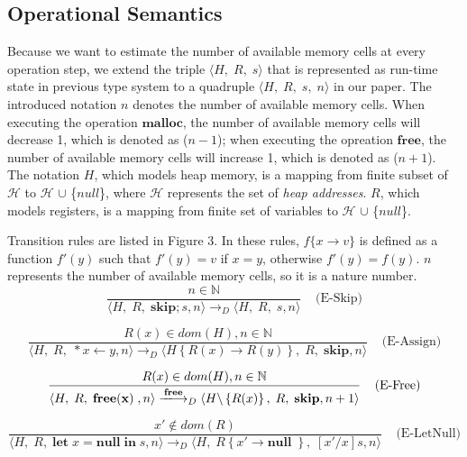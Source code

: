 \documentclass[english]{jssst_ppl} %
\newcommand\LET{\mathbf{let}\;}
\newcommand\FREE{\mathbf{free(x)}\;}
\newcommand\IN{\mathbf{in}\;}
\newcommand\SKIP{\mathbf{skip}}
\newcommand\Rtab{\; \; \; \;}
\newcommand\NULL{\mathbf{null}\;}
\newcommand\Lfc{\left\{}
\newcommand\Rfc{\right\}}
\newcommand\Lb{\left[}
\newcommand\Rb{\right]}
\newcommand\coma{,\;}
\newcommand\Malloc{\mathbf{malloc}}
\newcommand\Free{\mathbf{free}}
\begin{document}
\subsection{Operational Semantics}
Because we want to estimate the number of available memory cells at every operation step, we extend the triple $\langle H\coma R\coma s \rangle$ that is represented as run-time state in previous type system to a quadruple $\langle H\coma R\coma s\coma n \rangle$ in our paper. The introduced notation $n$ denotes the number of available memory cells. When executing the operation $\Malloc$, the number of available memory cells will decrease 1, which is denoted as ($n - 1$); when executing the opreation $\Free$, the number of available memory cells will increase 1, which is denoted as ($n + 1$). The notation $H$, which models heap memory, is a mapping from finite subset of $\mathcal{H}$ to $\mathcal{H}$ $\cup$ \{$null$\}, where $\mathcal{H}$ represents the set of \emph{heap addresses}. $R$, which models registers, is a mapping from finite set of variables to $\mathcal{H}$ $\cup$ \{$null$\}.

Transition rules are listed in Figure 3. In these rules, $f\{x\to v\}$ is defined as a function $f'(y)$ such that $f'(y) = v$ if $x = y$, otherwise $f'(y) = f(y)$. $n$ represents the number of available memory cells, so it is a nature number.
$$
    \frac{n \in \mathbb{N}}
            {\langle H\coma R\coma  \SKIP;s , n \rangle
              \longrightarrow_{D}
                \langle H\coma R\coma   s , n \rangle }
     \Rtab \mbox{(E-Skip)}
$$

$$
     \frac{R(x) \in dom(H), n \in \mathbb{N}}
           {\langle H\coma R\coma  *x \leftarrow y , n \rangle
             \longrightarrow_{D}
             \langle H \Lfc R(x) \rightarrow R(y) \Rfc \coma R \coma   \SKIP , n  \rangle }
     \Rtab \mbox{(E-Assign)}
$$

$$
     \frac{R(x) \in dom(H) , n \in \mathbb{N}}
          {\langle H\coma R\coma  \FREE , n \rangle
            \xlongrightarrow{\Free}_{D}
            \langle H\backslash \Lfc R(x) \Rfc \coma R \coma   \SKIP , n+1  \rangle }
     \Rtab \mbox{(E-Free)}
$$

$$
     \frac{x' \notin dom(R)}
           {\langle H\coma R\coma  \LET x = \NULL \IN s , n \rangle
             \longrightarrow_{D}
             \langle H\coma R\Lfc x' \rightarrow \NULL \Rfc \coma   \Lb x'/x \Rb s , n  \rangle }
     \Rtab \mbox{(E-LetNull)}
$$
\end{document}
